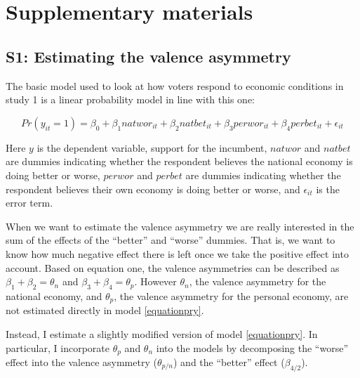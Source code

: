 \documentclass[a4paper,11pt]{article}
\newcommand{\beginsupplement}{%
	\setcounter{table}{0}
	\renewcommand{\thetable}{S.\arabic{table}}%
	\setcounter{figure}{0}
	\renewcommand{\thefigure}{S.\arabic{figure}}%
}
\begin{document}
	
	
	\begin{singlespace}
		\begin{small}
			
			
		\end{small}
	\end{singlespace}
	\newpage
	\beginsupplement
	
	\section{Supplementary materials}
	
	\subsection*{S1: Estimating the valence asymmetry}
	
	The basic model used to look at how voters respond to economic conditions in study 1 is a linear probability model in line with this one:
	
	\begin{equation}
		Pr(y_{it}=1)=\beta_0 + \beta_1 natwor_{it} + \beta_2 natbet_{it} + \beta_3 perwor_{it} + \beta_4 perbet_{it} + \epsilon_{it} \label{equationpry}
	\end{equation}
	
	Here $y$ is the dependent variable, support for the incumbent, $natwor$ and $natbet$ are dummies indicating whether the respondent believes the national economy is doing better or worse,  $perwor$ and $perbet$ are dummies indicating whether the respondent believes their own economy is doing better or worse, and $\epsilon_{it}$ is the error term.
	
	When we want to estimate the valence asymmetry we are really interested in the sum of the effects of the ``better'' and ``worse'' dummies. That is, we want to know how much negative effect there is left once we take the positive effect into account. Based on equation one, the valence asymmetries can be described as $\beta_1+\beta_2=\theta_n$ and $\beta_3+\beta_4=\theta_p$. However $\theta_n$, the valence asymmetry for the national economy, and $\theta_p$, the valence asymmetry for the personal economy, are not estimated directly in model \ref{equationpry}. 
	
	
	Instead, I estimate a slightly modified version of model \ref{equationpry}. In particular, I incorporate $\theta_p$ and $\theta_n$ into the models by decomposing the ``worse'' effect into the valence asymmetry ($\theta_{p/n}$) and the ``better'' effect ($\beta_{4/2}$). 
	
\end{document}
